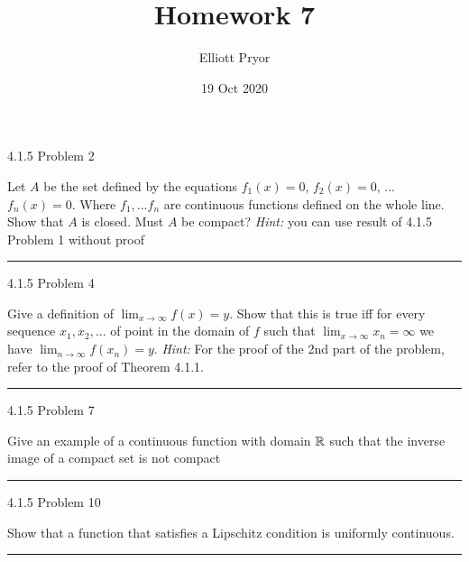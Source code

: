 \documentclass[11pt]{article}
\title{Homework 7}
\author{Elliott Pryor}
\date{19 Oct 2020}
\begin{document}
\maketitle

 4.1.5 Problem 2

Let $A$ be the set defined by the equations $f_1(x) = 0$, $f_2(x) = 0$, ... $f_n(x) = 0$. Where $f_1, ... f_n$ are continuous functions defined on the whole line. Show that $A$ is closed. Must $A$ be compact? \textit{Hint: } you can use result of 4.1.5 Problem 1 without proof
\hrule

\newpage
{} 4.1.5 Problem 4

Give a definition of $\lim_{x \to \infty} f(x) = y$. Show that this is true iff for every sequence $x_1, x_2, ...$ of point in the domain of $f$ such that $\lim_{x\to \infty} x_n = \infty$ we have $\lim_{n\to \infty} f(x_n) = y$. \textit{Hint: } For the proof of the 2nd part of the problem, refer to the proof of Theorem 4.1.1.
\hrule

\newpage
{} 4.1.5 Problem 7

Give an example of a continuous function with domain $\mathbb{R}$ such that the inverse image of a compact set is not compact

\hrule

\newpage
{} 4.1.5 Problem 10

Show that a function that satisfies a Lipschitz condition is uniformly continuous.
\hrule
\end{document}
